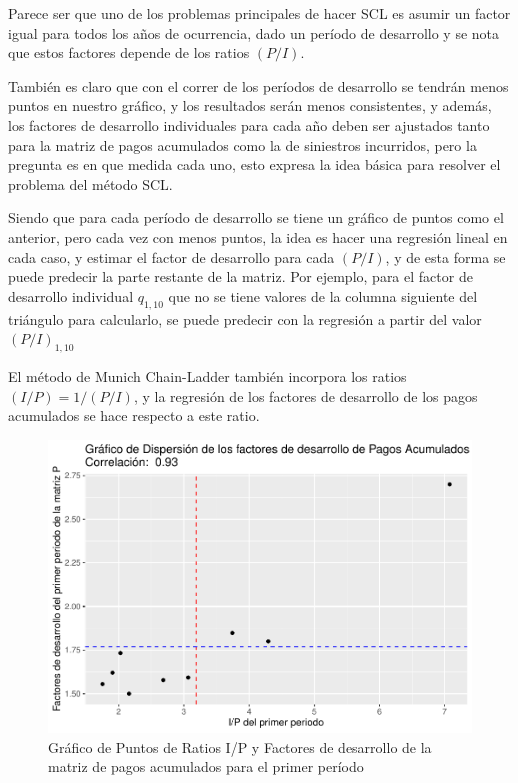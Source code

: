 \documentclass[
  12pt,
]{article}
\begin{document}
Parece ser que uno de los problemas principales de hacer SCL es asumir
un factor igual para todos los años de ocurrencia, dado un período de
desarrollo y se nota que estos factores depende de los ratios \((P/I)\).

También es claro que con el correr de los períodos de desarrollo se
tendrán menos puntos en nuestro gráfico, y los resultados serán menos
consistentes, y además, los factores de desarrollo individuales para
cada año deben ser ajustados tanto para la matriz de pagos acumulados
como la de siniestros incurridos, pero la pregunta es en que medida cada
uno, esto expresa la idea básica para resolver el problema del método
SCL.

Siendo que para cada período de desarrollo se tiene un gráfico de puntos
como el anterior, pero cada vez con menos puntos, la idea es hacer una
regresión lineal en cada caso, y estimar el factor de desarrollo para
cada \((P/I)\), y de esta forma se puede predecir la parte restante de
la matriz. Por ejemplo, para el factor de desarrollo individual
\(q_{1,10}\) que no se tiene valores de la columna siguiente del
triángulo para calcularlo, se puede predecir con la regresión a partir
del valor \((P/I)_{1,10}\)

El método de Munich Chain-Ladder también incorpora los ratios
\((I/P)=1/(P/I)\), y la regresión de los factores de desarrollo de los
pagos acumulados se hace respecto a este ratio.

\begin{figure}

{\centering \includegraphics[width=0.8\linewidth]{informe_files/figure-latex/unnamed-chunk-28-1} 

}

\caption{\label{reg3} Gráfico de Puntos de Ratios I/P y Factores de desarrollo de la matriz de pagos acumulados para el primer período}\label{fig:unnamed-chunk-28}
\end{figure}
\end{document}

